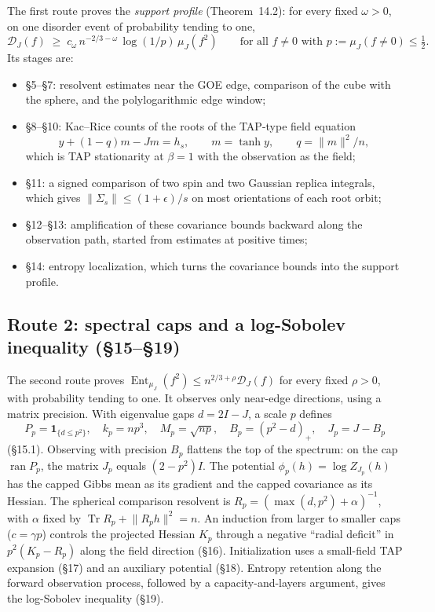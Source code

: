 \documentclass[11pt]{article}
\newcommand{\one}{\mathbf{1}}
\newcommand{\D}{\mathcal{D}}
\DeclareMathOperator{\Ent}{Ent}
\DeclareMathOperator{\Tr}{Tr}
\DeclareMathOperator{\ran}{ran}
\newcommand{\norm}[1]{\lVert #1\rVert}
\newcommand{\ploc}[2]{#1}
\begin{document}
The first route proves the \emph{support profile}
\ploc{(Theorem~14.2)}{profile-entropy.tex, prof:support-profile}: for every
fixed $\omega>0$, on one disorder event of probability tending to one,
\[
 \D_J(f)\;\ge\;c_\omega\,n^{-2/3-\omega}\,\log(1/p)\,\mu_J(f^2)
 \qquad\text{for all } f\ne0 \text{ with } p:=\mu_J(f\ne0)\le\tfrac12 .
\]
Its stages are:
\begin{itemize}
\item \S5--\S7: resolvent estimates near the GOE edge, comparison of the cube
with the sphere, and the polylogarithmic edge window;
\item \S8--\S10: Kac--Rice counts of the roots of the TAP-type field equation
\[
 y+(1-q)m-Jm=h_s,\qquad m=\tanh y,\qquad q=\norm m^2/n,
\]
which is TAP stationarity at $\beta=1$ with the observation as the field;
\item \S11: a signed comparison of two spin and two Gaussian replica integrals,
which gives $\norm{\Sigma_s}\le(1+\epsilon)/s$ on most orientations of each
root orbit;
\item \S12--\S13: amplification of these covariance bounds backward along the
observation path, started from estimates at positive times;
\item \S14: entropy localization, which turns the covariance bounds into the
support profile.
\end{itemize}

\subsection{Route 2: spectral caps and a log-Sobolev inequality (\S15--\S19)}

The second route proves $\Ent_{\mu_J}(f^2)\le n^{2/3+\rho}\D_J(f)$ for every
fixed $\rho>0$, with probability tending to one. It observes only near-edge
directions, using a matrix precision. With eigenvalue gaps $d=2I-J$, a scale
$p$ defines
\[
 P_p=\one_{\{d\le p^2\}},\quad k_p=np^3,\quad M_p=\sqrt{np},\quad
 B_p=(p^2-d)_+,\quad J_p=J-B_p
\]
\ploc{(\S15.1)}{cap-static.tex:38--45}. Observing with precision $B_p$ flattens
the top of the spectrum: on the cap $\ran P_p$, the matrix $J_p$ equals
$(2-p^2)I$. The potential $\phi_p(h)=\log Z_{J_p}(h)$ has the capped Gibbs mean
as its gradient and the capped covariance as its Hessian. The spherical
comparison resolvent is $R_p=(\max(d,p^2)+\alpha)^{-1}$, with $\alpha$ fixed by
$\Tr R_p+\norm{R_ph}^2=n$. An induction from larger to smaller caps
($c=\gamma p$) controls the projected Hessian $K_p$ through a negative
``radial deficit'' in $p^2(K_p-R_p)$ along the field direction (\S16).
Initialization uses a small-field TAP expansion (\S17) and an auxiliary
potential (\S18). Entropy retention along the forward observation process,
followed by a capacity-and-layers argument, gives the log-Sobolev inequality
(\S19).
\end{document}
